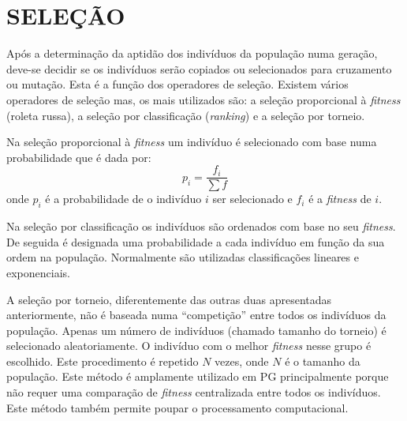 \section{SELEÇÃO}
\label{sec:2selecao}

Após a determinação da aptidão dos indivíduos da população numa geração, deve-se decidir se os indivíduos serão copiados ou selecionados para 
cruzamento ou mutação. Esta é a função dos operadores de seleção. Existem vários operadores de seleção mas, os mais utilizados são:
a seleção proporcional à \emph{fitness} (roleta russa), a seleção por classificação (\emph{ranking}) e a seleção por torneio.

Na seleção proporcional à \emph{fitness} um indivíduo é selecionado com base numa probabilidade que é dada por:
\begin{equation}
p_i = \frac{f_i}{\sum{f}}
\label{Equacao251}
\end{equation}
\noindent onde $p_i$ é a probabilidade de o indivíduo $i$ ser selecionado e $f_i$ é a \emph{fitness} de $i$.

Na seleção por classificação os indivíduos são ordenados com base no seu \emph{fitness}. De seguida é designada uma probabilidade a cada indivíduo em 
função da sua ordem na população. Normalmente são utilizadas classificações lineares e exponenciais.

A seleção por torneio, diferentemente das outras duas apresentadas anteriormente, não é baseada numa “competição” entre todos os indivíduos da 
população. Apenas um número de indivíduos (chamado tamanho do torneio) é selecionado aleatoriamente. O indivíduo com o melhor \emph{fitness} nesse 
grupo é escolhido. Este procedimento é repetido $N$ vezes, onde $N$ é o tamanho da população.  Este método é amplamente utilizado em \ac{PG} 
principalmente porque não requer uma comparação de \emph{fitness} centralizada entre todos os indivíduos. Este método também permite poupar o processamento computacional.